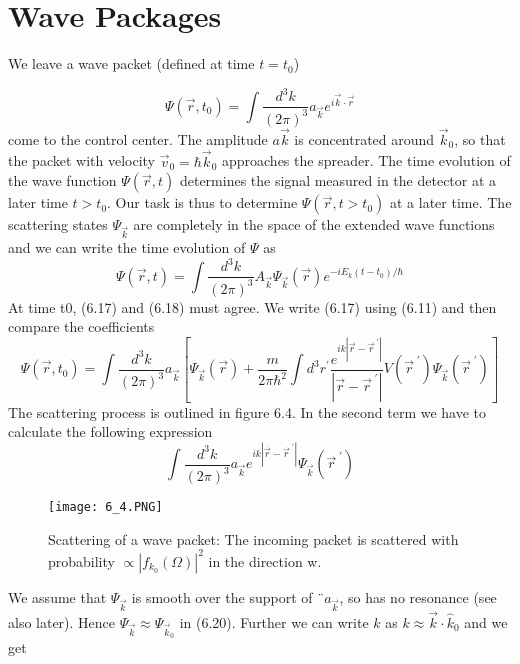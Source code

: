 \section{Wave Packages}
We leave a wave packet (defined at time $t = t_0$)

\begin{equation}
    \Psi\left(\vec{r}, t_{0}\right)=\int \frac{d^{3} k}{(2 \pi)^{3}} a_{\vec{k}} e^{i \vec{k} \cdot \vec{r}}
    \end{equation}
come to the control center. The amplitude $a\vec{k}$ is concentrated around $\vec{k}_0$, so that the packet with velocity $\vec{v}_0=\hbar\vec{k}_0$ approaches the spreader. The time evolution of the wave function $\Psi(\vec{r},t)$ determines the signal measured in the detector at a later time $t> t_0$. Our task is thus to determine $\Psi (\vec{r}, t> t_0)$ at a later time. The scattering states $\Psi_{\vec{k}}$ are completely in the space of the extended wave functions and we can write the time evolution of $\Psi$ as
%
\begin{equation}
    \Psi(\vec{r}, t)=\int \frac{d^{3} k}{(2 \pi)^{3}} A_{\vec{k}} \Psi_{\vec{k}}(\vec{r}) e^{-i E_{k}\left(t-t_{0}\right) / \hbar}
    \end{equation}
At time t0, (6.17) and (6.18) must agree. We write (6.17) using (6.11) and then compare the coefficients
\begin{equation}
    \Psi\left(\vec{r}, t_{0}\right)=\int \frac{d^{3} k}{(2 \pi)^{3}} a_{\vec{k}}\left[\Psi_{\vec{k}}(\vec{r})+\frac{m}{2 \pi \hbar^{2}} \int d^{3} r^{\prime} \frac{e^{i k\left|\vec{r}-\vec{r}^{\;\prime}\right|}}{\left|\vec{r}-\vec{r}^{\;\prime}\right|} V\left(\vec{r}^{\;\prime}\right) \Psi_{\vec{k}}\left(\vec{r}^{\;\prime}\right)\right]
    \end{equation}
The scattering process is outlined in figure 6.4. In the second term we have to calculate the following expression
\begin{equation}
    \int \frac{d^{3} k}{(2 \pi)^{3}} a_{\vec{k}} e^{i k\left|\vec{r}-\vec{r}^{\;\prime}\right|} \Psi_{\vec{k}}\left(\vec{r}^{\;\prime}\right)
    \end{equation}
\begin{figure}[ht]
        \centering
        \texttt{[image: 6\_4.PNG]}
        \caption{Scattering of a wave packet: The incoming packet is scattered with probability $\propto |f_{k_0}(\Omega)|^2$ in the direction w.}
\end{figure}
We assume that $\Psi_{\vec{k}}$ is smooth over the support of ¨$a_{\vec{k}}$, so has no resonance (see also later). Hence $\Psi_{\vec{k}}\approx\Psi_{\vec{k}_0}$ in (6.20). Further we can write $k$ as $k \approx \vec{k} \cdot\hat{k}_0$ and we get
